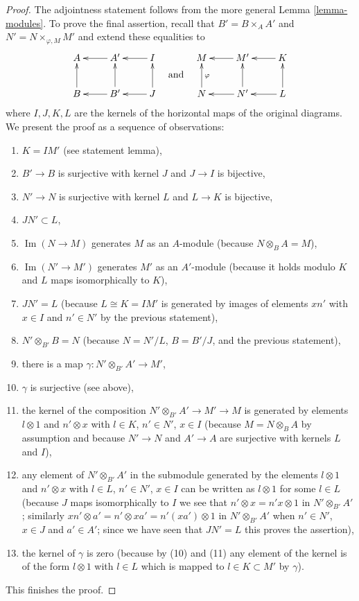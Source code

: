 \documentclass[10pt,a4paper]{amsart}
\theoremstyle{plain}
\theoremstyle{definition}
\theoremstyle{remark}
\numberwithin{equation}{subsection}
\def\Im{\mathop{\mathrm{Im}}}
\begin{document}
\begin{proof}
The adjointness statement follows from the more general
Lemma \ref{lemma-modules}.
To prove the final assertion, recall that
$B' = B \times_A A'$ and $N' = N \times_{\varphi, M} M'$ and extend
these equalities to 
$$
\vcenter{
\xymatrix{
A & A' \ar[l] & I \ar[l] \\
B \ar[u] & B' \ar[l] \ar[u] & J \ar[l] \ar[u]
}
}
\quad\text{and}\quad
\vcenter{
\xymatrix{
M & M' \ar[l] & K \ar[l] \\
N \ar[u]_\varphi & N' \ar[l] \ar[u] & L \ar[l] \ar[u]
}
}
$$
where $I, J, K, L$ are the kernels of the horizontal maps of the original
diagrams. We present the proof as a sequence of observations:
\begin{enumerate}
\item $K = IM'$ (see statement lemma),
\item $B' \to B$ is surjective with kernel $J$ and $J \to I$ is bijective,
\item $N' \to N$ is surjective with kernel $L$ and $L \to K$ is bijective,
\item $JN' \subset L$,
\item $\Im(N \to M)$ generates $M$ as an $A$-module
(because $N \otimes_B A = M$),
\item $\Im(N' \to M')$ generates $M'$ as an $A'$-module
(because it holds modulo $K$ and $L$ maps isomorphically to $K$),
\item $JN' = L$ (because $L \cong K = I M'$
is generated by images of elements $x n'$ with $x \in I$ and
$n' \in N'$ by the previous statement),
\item $N' \otimes_{B'} B = N$ (because $N = N'/L$, $B = B'/J$, and
the previous statement),
\item there is a map $\gamma : N' \otimes_{B'} A' \to M'$,
\item $\gamma$ is surjective (see above),
\item the kernel of the composition $N' \otimes_{B'} A' \to M' \to M$ 
is generated by elements $l \otimes 1$ and $n' \otimes x$ with
$l \in K$, $n' \in N'$, $x \in I$ (because $M = N \otimes_B A$ by assumption
and because $N' \to N$ and $A' \to A$ are surjective with kernels
$L$ and $I$),
\item any element of $N' \otimes_{B'} A'$ in the submodule generated
by the elements $l \otimes 1$ and $n' \otimes x$ with
$l \in L$, $n' \in N'$, $x \in I$ can be written as $l \otimes 1$
for some $l \in L$ (because $J$ maps isomorphically to $I$ we see
that $n' \otimes x = n'x \otimes 1$ in $N' \otimes_{B'} A'$;
similarly $x n' \otimes a' = n' \otimes xa' = n'(xa') \otimes 1$
in $N' \otimes_{B'} A'$ when $n' \in N'$, $x \in J$ and $a' \in A'$;
since we have seen that $JN' = L$ this proves the assertion),
\item the kernel of $\gamma$ is zero (because by (10) and (11) any element of
the kernel is of the form $l \otimes 1$ with $l \in L$ which
is mapped to $l \in K \subset M'$ by $\gamma$).
\end{enumerate}
This finishes the proof.
\end{proof}
\end{document}
